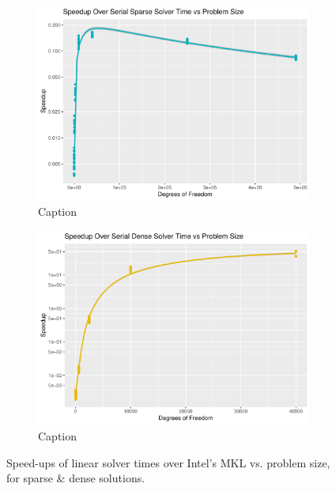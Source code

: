 \begin{figure}
	\centering
	\begin{subfigure}{0.48\linewidth}
		\centering
		\includegraphics[width = \linewidth]{Plots/solve_sparse_cpu_speedup_vs_n}
		\caption{Caption}
		\label{fig:sparse_solver}
	\end{subfigure}\hfill
	\begin{subfigure}{0.48\linewidth}
		\centering
		\includegraphics[width=\linewidth]{Plots/solve_dense_cpu_speedup_vs_n}
		\caption{Caption}
		\label{fig:dense_solver}
	\end{subfigure}
	\caption{Speed-ups of linear solver times over Intel's MKL vs. problem size, for sparse \& dense solutions.}
	\label{fig:solvers}
\end{figure}
